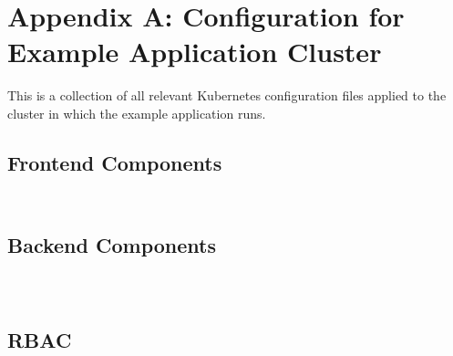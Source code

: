 \chapter*{Appendix A: Configuration for Example Application Cluster} \label{apx:A}

This is a collection of all relevant Kubernetes configuration files applied to the cluster in which the example application runs.


\section*{Frontend Components}

\inputminted[autogobble, frame=single, linenos]{yaml}{yaml/exa-frontend/exa-frontend-pod.yaml}

\inputminted[autogobble, frame=single, linenos]{yaml}{yaml/exa-frontend/exa-frontend-service.yaml}


\section*{Backend Components}

\inputminted[autogobble, frame=single, linenos]{yaml}{yaml/exa-backend/exa-backend-sa.yaml}
	
\inputminted[autogobble, frame=single, linenos]{yaml}{yaml/exa-backend/exa-backend-pod.yaml}
	 
\inputminted[autogobble, frame=single, linenos]{yaml}{yaml/exa-backend/exa-backend-service.yaml}


\section*{RBAC}

\inputminted[autogobble, frame=single, linenos]{yaml}{yaml/exa-backend/clusterrole_pod-reader.yaml}


